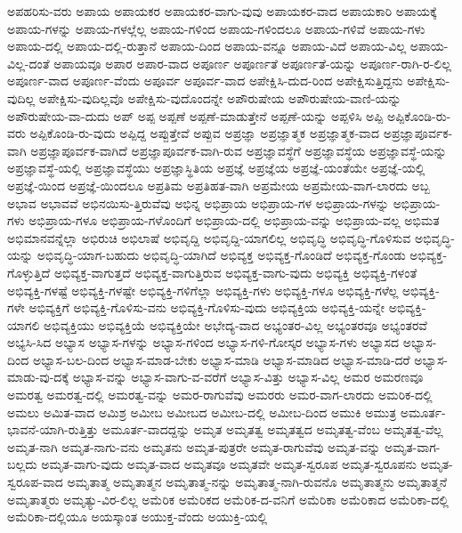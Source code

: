{ಅಪಹರಿಸು-ವರು
ಅಪಾಯ
ಅಪಾಯಕರ
ಅಪಾಯಕರ-ವಾಗು-ವುವು
ಅಪಾಯಕರ-ವಾದ
ಅಪಾಯಕಾರಿ
ಅಪಾಯಕ್ಕೆ
ಅಪಾಯ-ಗಳನ್ನು
ಅಪಾಯ-ಗಳಲ್ಲೆಲ್ಲ
ಅಪಾಯ-ಗಳಿಂದ
ಅಪಾಯ-ಗಳಿಂದಲೂ
ಅಪಾಯ-ಗಳಿವೆ
ಅಪಾಯ-ಗಳು
ಅಪಾಯ-ದಲ್ಲಿ
ಅಪಾಯ-ದಲ್ಲಿ-ರುತ್ತಾನೆ
ಅಪಾಯ-ದಿಂದ
ಅಪಾಯ-ವನ್ನೂ
ಅಪಾಯ-ವಿದೆ
ಅಪಾಯ-ವಿಲ್ಲ
ಅಪಾಯ-ವಿಲ್ಲ-ದಂತೆ
ಅಪಾಯವೂ
ಅಪಾರ
ಅಪಾರ-ವಾದ
ಅಪೂರ್ಣ
ಅಪೂರ್ಣತೆ
ಅಪೂರ್ಣತೆ-ಯನ್ನು
ಅಪೂರ್ಣ-ರಾಗಿ-ರ-ಲಿಲ್ಲ
ಅಪೂರ್ಣ-ವಾದ
ಅಪೂರ್ಣ-ವೆಂದು
ಅಪೂರ್ವ
ಅಪೂರ್ವ-ವಾದ
ಅಪೇಕ್ಷಿಸಿ-ದುದ-ರಿಂದ
ಅಪೇಕ್ಷಿಸುತ್ತಿದ್ದನು
ಅಪೇಕ್ಷಿಸು-ವುದಿಲ್ಲ
ಅಪೇಕ್ಷಿಸು-ವುದಿಲ್ಲವೊ
ಅಪೇಕ್ಷಿಸು-ವುದೊಂದನ್ನೇ
ಅಪೌರುಷೇಯ
ಅಪೌರುಷೇಯ-ವಾಣಿ-ಯನ್ನು
ಅಪೌರುಷೇಯ-ವಾ-ದುದು
ಅಪ್
ಅಪ್ಪ
ಅಪ್ಪಣೆ
ಅಪ್ಪಣೆ-ಮಾಡುತ್ತೇನೆ
ಅಪ್ಪಣೆ-ಯನ್ನು
ಅಪ್ಪಳಿಸಿ
ಅಪ್ಪಿ
ಅಪ್ಪಿಕೊಂಡಿ-ರು-ವರು
ಅಪ್ಪಿಕೊಂಡಿ-ರು-ವುದು
ಅಪ್ಪಿದ್ದ
ಅಪ್ಪುತ್ತೇವೆ
ಅಪ್ಪುವ
ಅಪ್ರಜ್ಞಾ
ಅಪ್ರಜ್ಞಾತ್ಮಕ
ಅಪ್ರಜ್ಞಾತ್ಮಕ-ವಾದ
ಅಪ್ರಜ್ಞಾಪೂರ್ವಕ-ವಾಗಿ
ಅಪ್ರಜ್ಞಾಪೂರ್ವಕ-ವಾಗಿದೆ
ಅಪ್ರಜ್ಞಾಪೂರ್ವಕ-ವಾಗಿ-ರುವ
ಅಪ್ರಜ್ಞಾವಸ್ಥೆಗೆ
ಅಪ್ರಜ್ಞಾವಸ್ಥೆಯ
ಅಪ್ರಜ್ಞಾವಸ್ಥೆ-ಯನ್ನು
ಅಪ್ರಜ್ಞಾವಸ್ಥೆ-ಯಲ್ಲಿ
ಅಪ್ರಜ್ಞಾವಸ್ಥೆಯು
ಅಪ್ರಜ್ಞಾಸ್ಥಿತಿಯ
ಅಪ್ರಜ್ಞೆ
ಅಪ್ರಜ್ಞೆಯ
ಅಪ್ರಜ್ಞೆ-ಯಂತೆಯೇ
ಅಪ್ರಜ್ಞೆ-ಯಲ್ಲಿ
ಅಪ್ರಜ್ಞೆ-ಯಿಂದ
ಅಪ್ರಜ್ಞೆ-ಯಿಂದಲೂ
ಅಪ್ರತಿಮ
ಅಪ್ರತಿಹತ-ವಾಗಿ
ಅಪ್ರಮೇಯ
ಅಪ್ರಮೇಯ-ವಾಗ-ಲಾರದು
ಅಬ್ಬ
ಅಭಾವ
ಅಭಾವವೆ
ಅಭಿನಯಿಸು-ತ್ತಿರುವೆವು
ಅಭಿನ್ನ
ಅಭಿಪ್ರಾಯ
ಅಭಿಪ್ರಾಯ-ಗಳ
ಅಭಿಪ್ರಾಯ-ಗಳನ್ನು
ಅಭಿಪ್ರಾಯ-ಗಳು
ಅಭಿಪ್ರಾಯ-ಗಳೂ
ಅಭಿಪ್ರಾಯ-ಗಳೊಂದಿಗೆ
ಅಭಿಪ್ರಾಯ-ದಲ್ಲಿ
ಅಭಿಪ್ರಾಯ-ವನ್ನು
ಅಭಿಪ್ರಾಯ-ವಲ್ಲ
ಅಭಿಮತ
ಅಭಿಮಾನವನ್ನೆಲ್ಲಾ
ಅಭಿರುಚಿ
ಅಭಿಲಾಷೆ
ಅಭಿವೃದ್ದಿ
ಅಭಿವೃದ್ದಿ-ಯಾಗಲಿಲ್ಲ
ಅಭಿವೃದ್ಧಿ
ಅಭಿವೃದ್ಧಿ-ಗೊಳಿಸುವ
ಅಭಿವೃದ್ಧಿ-ಯನ್ನು
ಅಭಿವೃದ್ಧಿ-ಯಾಗ-ಬಹುದು
ಅಭಿವೃದ್ಧಿ-ಯಾಗಿದೆ
ಅಭಿವ್ಯಕ್ತ
ಅಭಿವ್ಯಕ್ತ-ಗೊಂಡಿದೆ
ಅಭಿವ್ಯಕ್ತ-ಗೊಂಡು
ಅಭಿವ್ಯಕ್ತ-ಗೊಳ್ಳುತ್ತಿದೆ
ಅಭಿವ್ಯಕ್ತ-ವಾಗುತ್ತದೆ
ಅಭಿವ್ಯಕ್ತ-ವಾಗುತ್ತಿರುವ
ಅಭಿವ್ಯಕ್ತ-ವಾಗು-ವುದು
ಅಭಿವ್ಯಕ್ತಿ
ಅಭಿವ್ಯಕ್ತಿ-ಗಳಂತೆ
ಅಭಿವ್ಯಕ್ತಿ-ಗಳಷ್ಟೆ
ಅಭಿವ್ಯಕ್ತಿ-ಗಳಷ್ಟೇ
ಅಭಿವ್ಯಕ್ತಿ-ಗಳಿಗೆಲ್ಲಾ
ಅಭಿವ್ಯಕ್ತಿ-ಗಳು
ಅಭಿವ್ಯಕ್ತಿ-ಗಳೂ
ಅಭಿವ್ಯಕ್ತಿ-ಗಳೆಲ್ಲ
ಅಭಿವ್ಯಕ್ತಿ-ಗಳೇ
ಅಭಿವ್ಯಕ್ತಿಗೆ
ಅಭಿವ್ಯಕ್ತಿ-ಗೊಳಿಸು-ವನು
ಅಭಿವ್ಯಕ್ತಿ-ಗೊಳಿಸು-ವುದು
ಅಭಿವ್ಯಕ್ತಿಯ
ಅಭಿವ್ಯಕ್ತಿ-ಯನ್ನೇ
ಅಭಿವ್ಯಕ್ತಿ-ಯಾಗಲಿ
ಅಭಿವ್ಯಕ್ತಿಯು
ಅಭಿವ್ಯಕ್ತಿಯೆ
ಅಭಿವ್ಯಕ್ತಿಯೇ
ಅಭೇದ್ಯ-ವಾದ
ಅಭ್ಯಂತರ-ವಿಲ್ಲ
ಅಭ್ಯಂತರವೂ
ಅಭ್ಯಂತರವೆ
ಅಭ್ಯಸಿ-ಸಿದ
ಅಭ್ಯಾಸ
ಅಭ್ಯಾಸ-ಗಳನ್ನು
ಅಭ್ಯಾಸ-ಗಳಿಂದ
ಅಭ್ಯಾಸ-ಗಳಿ-ಗೋಸ್ಕರ
ಅಭ್ಯಾಸ-ಗಳು
ಅಭ್ಯಾಸದ
ಅಭ್ಯಾಸ-ದಿಂದ
ಅಭ್ಯಾಸ-ಬಲ-ದಿಂದ
ಅಭ್ಯಾಸ-ಮಾಡ-ಬೇಕು
ಅಭ್ಯಾಸ-ಮಾಡಿ
ಅಭ್ಯಾಸ-ಮಾಡಿದ
ಅಭ್ಯಾಸ-ಮಾಡಿ-ದರೆ
ಅಭ್ಯಾಸ-ಮಾಡು-ವು-ದಕ್ಕೆ
ಅಭ್ಯಾಸ-ವನ್ನು
ಅಭ್ಯಾಸ-ವಾಗು-ವ-ವರೆಗೆ
ಅಭ್ಯಾಸ-ವಿತ್ತು
ಅಭ್ಯಾಸ-ವಿಲ್ಲ
ಅಮರ
ಅಮರಣವೂ
ಅಮರತ್ವ
ಅಮರತ್ವ-ದಲ್ಲಿ
ಅಮರತ್ವ-ವನ್ನು
ಅಮರ-ರಾಗುವೆವು
ಅಮರರು
ಅಮರ-ವಾಗ-ಲಾರದು
ಅಮರಿಕ-ದಲ್ಲಿ
ಅಮಲು
ಅಮಿತ-ವಾದ
ಅಮಿಶ್ರ
ಅಮೀಬ
ಅಮೀಬದ
ಅಮೀಬ-ದಲ್ಲಿ
ಅಮೀಬ-ದಿಂದ
ಅಮುಕಿ
ಅಮುತ್ರ
ಅಮೂರ್ತ-ಭಾವನೆ-ಯಾಗಿ-ರುತ್ತಿತ್ತು
ಅಮೂರ್ತ-ವಾದದ್ದನ್ನು
ಅಮೃತ
ಅಮೃತತ್ವ
ಅಮೃತತ್ವದ
ಅಮೃತತ್ವ-ವೆಂಬ
ಅಮೃತತ್ವ-ವೆಲ್ಲ
ಅಮೃತ-ನಾಗಿ
ಅಮೃತ-ನಾಗು-ವನು
ಅಮೃತನು
ಅಮೃತ-ಪುತ್ರರೇ
ಅಮೃತ-ರಾಗುವೆವು
ಅಮೃತ-ವನ್ನು
ಅಮೃತ-ವಾಗ-ಬಲ್ಲದು
ಅಮೃತ-ವಾಗು-ವುದು
ಅಮೃತ-ವಾದ
ಅಮೃತವೂ
ಅಮೃತವೇ
ಅಮೃತ-ಸ್ವರೂಪ
ಅಮೃತ-ಸ್ವರೂಪನು
ಅಮೃತ-ಸ್ವರೂಪ-ವಾದ
ಅಮೃತಾತ್ಮ
ಅಮೃತಾತ್ಮನ
ಅಮೃತಾತ್ಮ-ನನ್ನು
ಅಮೃತಾತ್ಮ-ನಾಗಿ-ರುವನೊ
ಅಮೃತಾತ್ಮನು
ಅಮೃತಾತ್ಮನೆ
ಅಮೃತಾತ್ಮರು
ಅಮೃತ್ಯು-ವಿರ-ಲಿಲ್ಲ
ಅಮೆರಿಕ
ಅಮೆರಿಕದ
ಅಮೆರಿಕ-ದ-ವನಿಗೆ
ಅಮೆರಿಕಾ
ಅಮೆರಿಕಾದ
ಅಮೆರಿಕಾ-ದಲ್ಲಿ
ಅಮೆರಿಕಾ-ದಲ್ಲಿಯೂ
ಅಯಸ್ಕಾಂತ
ಅಯುಕ್ತ-ವೆಂದು
ಅಯುಕ್ತಿ-ಯಲ್ಲಿ
}
